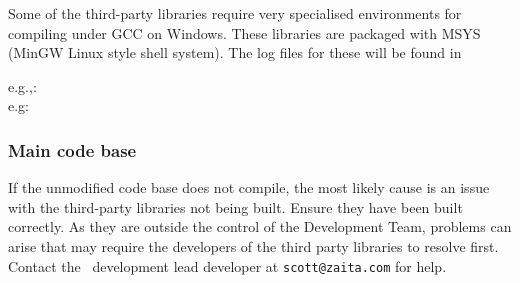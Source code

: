 Some of the third-party libraries require very specialised environments for compiling under GCC on Windows. These libraries are packaged with MSYS (MinGW Linux style shell system). The log files for these will be found in 

e.g.,: \\
e.g: 

\subsubsection{Main code base}

If the unmodified code base does not compile, the most likely cause is an issue with the third-party libraries not being built. Ensure they have been built correctly. As they are outside the control of the Development Team, problems can arise that may require the developers of the third party libraries to resolve first. Contact the \CNAME\ development lead developer at \texttt{scott@zaita.com} for help.

